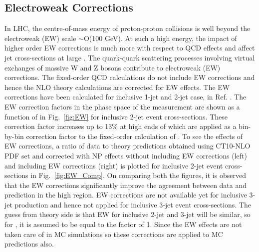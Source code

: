 \subsection{Electroweak Corrections}
\label{sec:EW}
In LHC, the centre-of-mass energy of proton-proton collisions is well beyond the electroweak (EW) scale $\sim$O(100 GeV). At such a high energy, the impact of higher order EW corrections is much more with respect to QCD effects \cite{Hollik:2004dz} and affect jet cross-sections at large \httwo. The quark-quark scattering processes involving virtual exchanges of massive W and Z bosons contribute to electroweak (EW) corrections. The fixed-order QCD calculations do not include EW corrections and hence the NLO theory calculations are corrected for EW effects. The EW corrections have been calculated for inclusive 1-jet and 2-jet case, in Ref. \cite{Dittmaier:2012kx}. The EW correction factors in the phase space of the measurement are shown as a function of \httwo in Fig.~\ref{fig:EW} for inclusive 2-jet event cross-sections. These correction factor increases up to 13\% at high ends of \httwo which are applied as a bin-by-bin correction factor to the fixed-order calculation of \NLOJETPP. To see the effects of EW corrections, a ratio of data to theory predictions obtained using CT10-NLO PDF set and corrected with NP effects without including EW corrections (left) and including EW corrections (right) is plotted for inclusive 2-jet event cross-sections in Fig.~\ref{fig:EW_Comp}. On comparing both the figures, it is observed that the EW corrections significantly improve the agreement between data and prediction in the high \httwo region. EW corrections are not available yet for inclusive 3-jet production and hence not applied for inclusive 3-jet event cross-sections. The guess from theory side is that EW for inclusive 2-jet and 3-jet will be similar, so for \ratio, it is assumed to be equal to the factor of 1. Since the EW effects are not taken care of in MC simulations so these corrections are applied to MC predictions also. 

